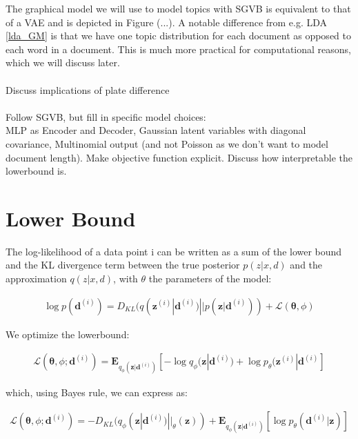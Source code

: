 The graphical model we will use to model topics with SGVB is  equivalent to that of a VAE and is depicted in Figure (...). A notable difference from e.g. LDA \ref{lda_GM} is that we have one topic distribution for each document as opposed to each word in a document. This is much more practical for computational reasons, which we will discuss later. \\ \\

Discuss implications of plate difference \\ \\

Follow SGVB, but fill in specific model choices:  \\ 
MLP as Encoder and Decoder, Gaussian latent variables with diagonal covariance, Multinomial output (and not Poisson as we don't want to model document length). Make objective function explicit. Discuss how interpretable the lowerbound is. 

\section{Lower Bound}

The log-likelihood of a data point i can be written as a sum of the lower bound and the KL divergence term between the true posterior $p(z|x,d)$ and the approximation $q(z|x,d)$, with $\theta$ the parameters of the model:

\begin{align*}
	\log p(\mathbf{d}^{(i)}) = D_{KL}(q(\mathbf{z}^{(i)}|\mathbf{d}^{(i)}) || p(\mathbf{z}|\mathbf{d}^{(i)})) + \mathcal{L}(\mathbf{\theta}, \phi)
\end{align*}

We optimize the lowerbound: 

\begin{align}
\mathcal{L}(\mathbf{\theta}, \phi; \mathbf{d}^{(i)}) = 
\mathbf{E}_{q_\phi (\mathbf{z}|\mathbf{d}^{(i)})}[-\log q_\phi (\mathbf{z}| \mathbf{d}^{(i)})+\log p_\theta(\mathbf{z}^{(i)}|\mathbf{d}^{(i)}]
\end{align}

which, using Bayes rule, we can express as:

\begin{align}
\mathcal{L}(\mathbf{\theta}, \phi; \mathbf{d}^{(i)}) = -D_{KL}(q_\phi (\mathbf{z}| \mathbf{d}^{(i)})||_\theta (\mathbf{z})) + \mathbf{E}_{q_\phi(\mathbf{z}|\mathbf{d}^{(i)})}[\log p_\theta (\mathbf{d}^{(i)}|\mathbf{z})]
\end{align}


